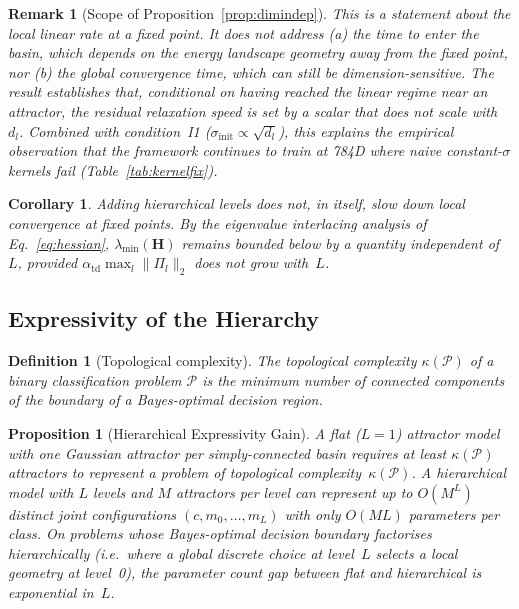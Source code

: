 \documentclass[11pt,a4paper]{article}
\newtheorem{proposition}[theorem]{Proposition}
\newtheorem{corollary}[theorem]{Corollary}
\newtheorem{definition}[theorem]{Definition}
\newtheorem{remark}[theorem]{Remark}
\begin{document}
\begin{remark}[Scope of Proposition~\ref{prop:dimindep}]
This is a statement about the \emph{local} linear rate at a fixed point. It does not
address (a) the time to \emph{enter} the basin, which depends on the energy landscape
geometry away from the fixed point, nor (b) the global convergence time, which can still
be dimension-sensitive. The result establishes that, \emph{conditional on having reached
the linear regime near an attractor}, the residual relaxation speed is set by a scalar
that does not scale with~$d_l$. Combined with condition~I1
($\sigma_{\mathrm{init}} \propto \sqrt{d_l}$), this explains the empirical observation
that the framework continues to train at 784D where naive constant-$\sigma$ kernels fail
(Table~\ref{tab:kernelfix}).
\end{remark}

\begin{corollary}
\label{cor:depth}
Adding hierarchical levels does not, in itself, slow down local convergence at fixed
points. By the eigenvalue interlacing analysis of Eq.~\ref{eq:hessian},
$\lambda_{\min}(\mathbf{H})$ remains bounded below by a quantity independent of~$L$,
provided $\alpha_{\mathrm{td}}\max_l\|\Pi_l\|_2$ does not grow with~$L$.
\end{corollary}

\subsection{Expressivity of the Hierarchy}
\label{sec:theory:expressivity}

\begin{definition}[Topological complexity]
The topological complexity $\kappa(\mathcal{P})$ of a binary classification problem
$\mathcal{P}$ is the minimum number of connected components of the boundary of a Bayes-optimal
decision region.
\end{definition}

\begin{proposition}[Hierarchical Expressivity Gain]
\label{prop:expressivity}
A flat ($L=1$) attractor model with one Gaussian attractor per simply-connected basin
requires at least $\kappa(\mathcal{P})$ attractors to represent a problem of topological
complexity~$\kappa(\mathcal{P})$. A hierarchical model with $L$ levels and $M$ attractors
per level can represent up to $O(M^L)$ distinct joint configurations $(c,m_0,\ldots,m_L)$
with only $O(ML)$ parameters per class. On problems whose Bayes-optimal decision boundary
factorises hierarchically (i.e.\ where a global discrete choice at level~$L$ selects a
local geometry at level~0), the parameter count gap between flat and hierarchical is
\emph{exponential in~$L$}.
\end{proposition}
\end{document}
